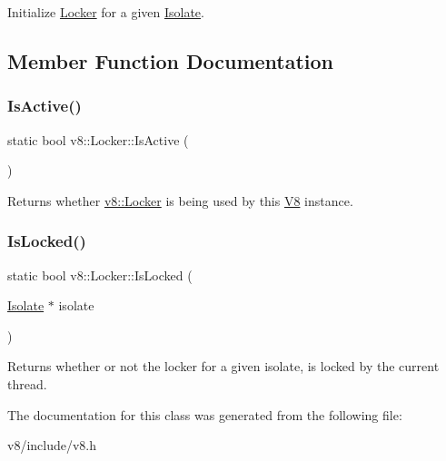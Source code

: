 Initialize \mbox{\hyperlink{classv8_1_1Locker}{Locker}} for a given \mbox{\hyperlink{classv8_1_1Isolate}{Isolate}}. 

\subsection{Member Function Documentation}
\mbox{\label{classv8_1_1Locker_a19d2b640f2f9b3dd0ec3a6c09a0442ed}} 
\subsubsection{\texorpdfstring{Is\+Active()}{IsActive()}}
{\footnotesize\ttfamily static bool v8\+::\+Locker\+::\+Is\+Active (\begin{DoxyParamCaption}{ }\end{DoxyParamCaption})\hspace{0.3cm}{\ttfamily [static]}}

Returns whether \mbox{\hyperlink{classv8_1_1Locker}{v8\+::\+Locker}} is being used by this \mbox{\hyperlink{classv8_1_1V8}{V8}} instance. \mbox{\label{classv8_1_1Locker_a3ae563ffdd9e8b5a0100f0ae756b3a6a}} 
\subsubsection{\texorpdfstring{Is\+Locked()}{IsLocked()}}
{\footnotesize\ttfamily static bool v8\+::\+Locker\+::\+Is\+Locked (\begin{DoxyParamCaption}\item[{\mbox{\hyperlink{classv8_1_1Isolate}{Isolate}} $\ast$}]{isolate }\end{DoxyParamCaption})\hspace{0.3cm}{\ttfamily [static]}}

Returns whether or not the locker for a given isolate, is locked by the current thread. 

The documentation for this class was generated from the following file\+:\begin{DoxyCompactItemize}
\item 
v8/include/v8.\+h\end{DoxyCompactItemize}
